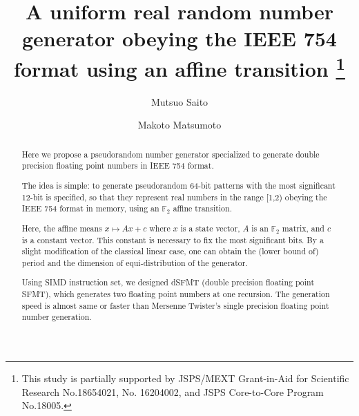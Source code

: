 \documentclass{svmult}
\def\bbf2{\ifmmode \mathbb{F}_2 \else $\mathbb{F}_2$ \fi}
\begin{document}

\title*{A uniform real random number generator obeying the IEEE 754
  format using an affine transition \thanks{This study is partially
    supported by JSPS/MEXT Grant-in-Aid for Scientific Research
    No.18654021, No. 16204002, and JSPS Core-to-Core Program
    No.18005.}}


\author{Mutsuo Saito\and
Makoto Matsumoto}
%

\maketitle
            
\begin{abstract} 

  Here we propose a pseudorandom number generator specialized to
  generate double precision floating point numbers in IEEE 754 format.

  The idea is simple: to generate pseudorandom 64-bit patterns with
  the most significant 12-bit is specified, so that they represent
  real numbers in the range [1,2) obeying the IEEE 754 format in
  memory, using an $\mathbb{F}_2$ affine transition.

  Here, the affine means $x \mapsto Ax+c$ where
  $x$ is a state vector, $A$ is an $\mathbb{F}_2$
  matrix, and $c$ is a constant vector. This constant
  is necessary to fix the most significant bits.
  By a slight modification of the classical linear case,
  one can obtain the (lower bound of) period and the dimension of
  equi-distribution of the generator.

  Using SIMD instruction set, we designed dSFMT (double precision floating
  point SFMT), which generates two floating point numbers at one recursion.
  The generation speed is almost same or faster than Mersenne Twister's
  single precision floating point number generation.
\end{abstract}
\end{document}
